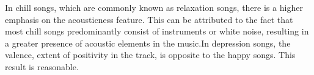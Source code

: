 \documentclass{article}
\begin{document}
In chill songs, which are commonly known as relaxation songs, there is a higher emphasis on the acousticness feature. This can be attributed to the fact that most chill songs predominantly consist of instruments or white noise, resulting in a greater presence of acoustic elements in the music.In depression songs, the valence, extent of positivity in the track, is opposite to the happy songs. This result is reasonable. 

\newpage












\end{document}

